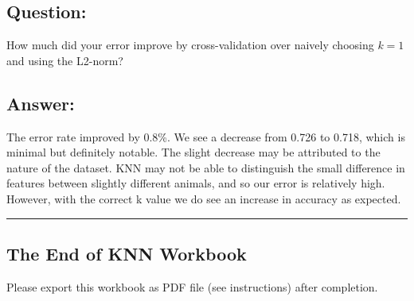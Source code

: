 \documentclass[11pt]{article}
\begin{document}
    \hypertarget{question}{%
\subsection{Question:}\label{question}}

How much did your error improve by cross-validation over naively
choosing \(k=1\) and using the L2-norm?

    \hypertarget{answer}{%
\subsection{Answer:}\label{answer}}

The error rate improved by 0.8\%. We see a decrease from 0.726 to 0.718,
which is minimal but definitely notable. The slight decrease may be
attributed to the nature of the dataset. KNN may not be able to
distinguish the small difference in features between slightly different
animals, and so our error is relatively high. However, with the correct
k value we do see an increase in accuracy as expected.

    \begin{center}\rule{0.5\linewidth}{\linethickness}\end{center}

\hypertarget{the-end-of-knn-workbook}{%
\subsection{The End of KNN Workbook}\label{the-end-of-knn-workbook}}

Please export this workbook as PDF file (see instructions) after
completion.


    
    
    
    
\end{document}
